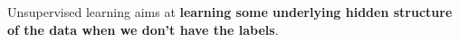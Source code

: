 Unsupervised learning aims at \textbf{learning some underlying hidden structure of the data when we don't have the labels}.

\vspace{5mm}